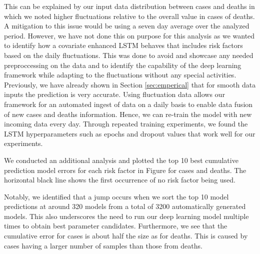 \documentclass[a4paper, inpress]{jds} %
\renewcommand{\_}{%
    \textunderscore\hspace{0pt}%
}
\begin{document}
This can be explained by our input data distribution between cases and deaths in which we noted higher
fluctuations relative to the overall value in cases of deaths. 
A mitigation to this issue
would be using a seven day average over the analyzed period. However,
we have not done this on purpose for this analysis as we wanted to
identify how a covariate enhanced LSTM behaves that includes risk
factors based on the daily fluctuations. This was done to avoid and
showcase any needed preproccessing on the data and to identify the
capability of the deep learning framework while adapting to the
fluctuations without any special activities. Previously, we have
already shown in Section \ref{sec:emperical} that for smooth data
inputs the prediction is very accurate.  Using fluctuation data allows
our framework for an automated ingest of data on a daily basis to
enable data fusion of new cases and deaths information. Hence, we can
re-train the model with new incoming data every day. Through repeated
training experiments, we found the LSTM hyperparameters such as epochs
and dropout values that work well for our experiments.

We conducted an additional analysis and plotted the top 10 best
cumulative prediction model errors for each risk factor in
Figure \label{fig:place-top10} for cases and deaths.  The horizontal
black line shows the first occurrence of no risk factor being used.

Notably, we identified that a jump occurs when we sort the top 10
model predictions at around 320 models from a total of 3200
automatically generated models. This also underscores the need to run
our deep learning model multiple times to obtain best parameter
candidates.  Furthermore, we see that the cumulative error for cases
is about half the size as for deaths. This is caused by cases having a
larger number of samples than those from deaths.

\end{document}
